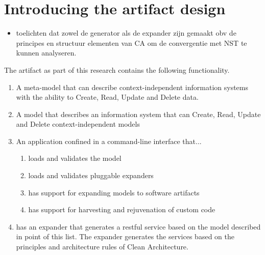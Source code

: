 \section{Introducing the artifact design} \label{sec:artifact_intro}

\begin{itemize}
    \item toelichten dat zowel de generator als de expander zijn gemaakt obv de principes
    en structuur elementen van CA om de convergentie met NST te kunnen analyseren.
\end{itemize}

\renewcommand{\labelenumii}{\arabic{enumi}.\arabic{enumii}}
\renewcommand{\labelenumiii}{\arabic{enumi}.\arabic{enumii}.\arabic{enumiii}}
\renewcommand{\labelenumiv}{\arabic{enumi}.\arabic{enumii}.\arabic{enumiii}.\arabic{enumiv}}

The artifact as part of this research contains the following functionality.

\begin{enumerate}
    \item A meta-model that can describe context-independent information systems
    with the ability to Create, Read, Update and Delete data.
    \item A model that describes an information system that can Create, Read, Update and
    Delete context-independent models
    \item An application confined in a command-line interface that...
    \begin{enumerate}
        \item loads and validates the model 
        \item loads and validates pluggable expanders
        \item has support for expanding models to software artifacts
        \item has support for harvesting and rejuvenation of custom code
    \end{enumerate}
    \item has an expander that generates a restful service based on the model described
    in point of this list. The expander generates the services based on the principles
    and architecture rules of Clean Architecture.
    
\end{enumerate}